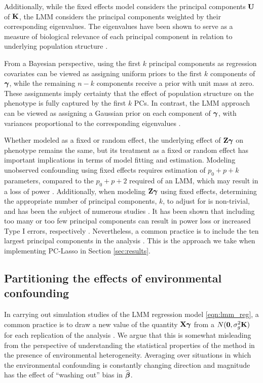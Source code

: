 Additionally, while the fixed effects model considers the principal components $\textbf{U}$ of $\textbf{K}$, the LMM considers the principal components weighted by their corresponding eigenvalues. The eigenvalues have been shown to serve as a measure of biological relevance of each principal component in relation to underlying population structure \citep{hoffman2013correcting, price2006principal}. 

From a Bayesian perspective, using the first $k$ principal components as regression covariates can be viewed as assigning uniform priors to the first $k$ components of $\boldsymbol{\gamma}$, while the remaining $n - k$ components receive a prior with unit mass at zero. These assignments imply certainty that the effect of population structure on the phenotype is fully captured by the first $k$ PCs. In contrast, the LMM approach can be viewed as assigning a Gaussian prior on each component of $\boldsymbol{\gamma}$, with variances proportional to the corresponding eigenvalues \citep{astle2009population}. 

Whether modeled as a fixed or random effect, the underlying effect of $\textbf{Z} \boldsymbol{\gamma}$ on phenotype remains the same, but its treatment as a fixed or random effect has important implications in terms of model fitting and estimation. Modeling unobserved confounding using fixed effects requires estimation of $p_0 + p + k$ parameters, compared to the $p_0 + p + 2$ required of an LMM, which may result in a loss of power \citep{zhang2015principal}. Additionally, when modeling $\textbf{Z} \boldsymbol{\gamma}$ using fixed effects, determining the appropriate number of principal components, $k$, to adjust for is non-trivial, and has been the subject of numerous studies \citep{patterson2006population, zhao2018practical}. It has been shown that including too many or too few principal components can result in power loss or increased Type I errors, respectively \citep{zhang2015principal}. Nevertheless, a common practice is to include the ten largest principal components in the analysis \citep{zhao2018practical}. This is the approach we take when implementing PC-Lasso in Section \ref{sec:results}.


\subsection{Partitioning the effects of environmental confounding}
\label{sec:sim_env_conf}

In carrying out simulation studies of the LMM regression model \eqref{eqn:lmm_reg}, a common practice is to draw a new value of the quantity $\textbf{X}\boldsymbol{\gamma}$ from a $N(\boldsymbol{0}, \sigma^2_g \textbf{K})$ for each replication of the analysis \citep{Rakitsch2012, bhatnagar2019simultaneous}.  We argue that this is somewhat misleading from the perspective of understanding the statistical properties of the method in the presence of environmental heterogeneity. Averaging over situations in which the environmental confounding is constantly changing direction and magnitude has the effect of ``washing out'' bias in $\widehat{\boldsymbol{\beta}{}}$. 

